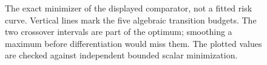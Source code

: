 \begin{figure}[htbp]
\centering

\caption{The exact minimizer of the displayed comparator, not a fitted risk curve. Vertical lines mark the five algebraic transition budgets. The two crossover intervals are part of the optimum; smoothing a maximum before differentiation would miss them. The plotted values are checked against independent bounded scalar minimization.}\label{fig:strata-phase}
\end{figure}
